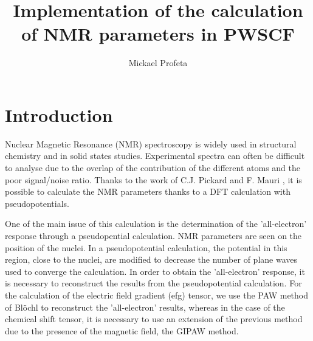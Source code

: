 \documentclass[11pt, a4paper]{article}
\title{Implementation of the calculation of NMR parameters in PWSCF}
\author{Mickael Profeta}
\begin{document}
\maketitle 

\section{Introduction}
Nuclear Magnetic Resonance (NMR) spectroscopy is widely used in
structural chemistry and in solid states studies. Experimental spectra
can often be difficult to analyse due to the overlap of the
contribution of the different atoms and the poor signal/noise
ratio. Thanks to the work of C.J. Pickard and F. Mauri
\cite{PRB_GIPAW}, it is possible to calculate the NMR parameters
thanks to a DFT calculation with pseudopotentials.

One of the main issue of this calculation is the determination of the
'all-electron' response through a pseudopential calculation. NMR
parameters are seen on the position of the nuclei.  In a
pseudopotential calculation, the potential in this region, close to
the nuclei, are modified to decrease the number of plane waves used to
converge the calculation. In order to obtain the 'all-electron'
response, it is necessary to reconstruct the results from the
pseudopotential calculation. For the calculation of the electric field
gradient (efg) tensor, we use the PAW method of Bl\"ochl \cite{blochl}
to reconstruct the 'all-electron' results, whereas in the case of the
chemical shift tensor, it is necessary to use an extension of the
previous method due to the presence of the magnetic field, the GIPAW
method\cite{PRB_GIPAW}.
\end{document}
